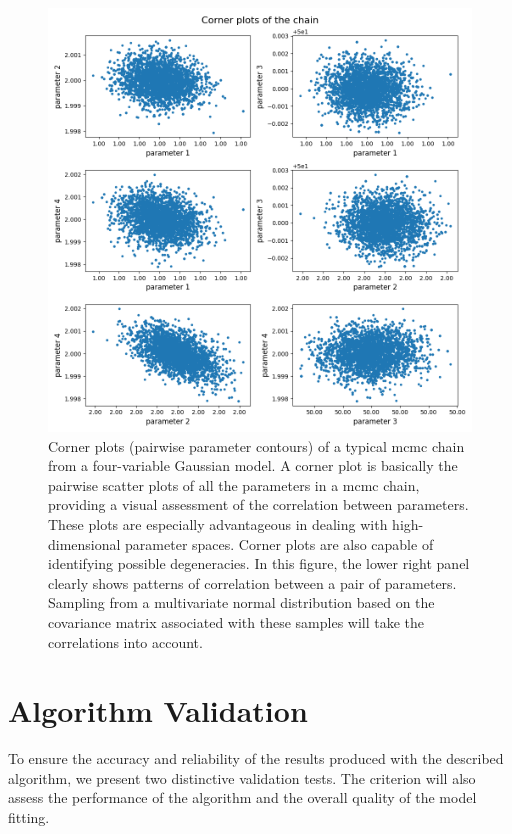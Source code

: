 \documentclass[12pt, TexShade, letterpaper]{report}
\begin{document}
\begin{figure}[h!]
\centering
\includegraphics[scale =0.6]{corner_plots.png}
\caption[Corner plots of an \gls{mcmc} chain]{Corner plots (pairwise parameter contours) of a typical \gls{mcmc} chain from a four-variable Gaussian model. 
 A corner plot is basically the pairwise scatter plots of all the parameters in a \gls{mcmc} chain, providing a visual assessment of the correlation between parameters. These plots are especially advantageous in dealing with high-dimensional parameter spaces. Corner plots are also capable of identifying possible degeneracies. In this figure, the lower right panel clearly shows patterns of correlation between a pair of parameters. Sampling from a multivariate normal distribution based on the covariance matrix associated with these samples will take the correlations into account.}
\label{fig:corner_plots}
\end{figure}

\section{Algorithm Validation}
\label{chap:method,sub:test}
To ensure the accuracy and reliability of the results produced with the described algorithm, we present two distinctive validation tests. The criterion will also assess the performance of the algorithm and the overall quality of the model fitting.\par
\end{document}
